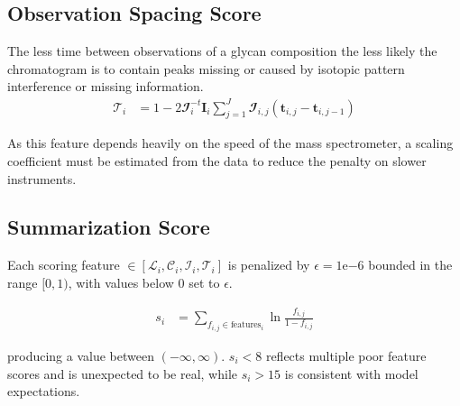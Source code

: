     \subsection{Observation Spacing Score}
        The less time between observations of a glycan composition the less likely the chromatogram
        is to contain peaks missing or caused by isotopic pattern interference or missing information.
        \begin{align}
            \mathscr{T}_i &= 1 - 2\mathbfcal{I}_i^{-t}\mathbf{I}_i\sum_{j=1}^J\mathbfcal{I}_{i, j}(
                \mathbf{t}_{i, j} - \mathbf{t}_{i, j - 1})
        \end{align}

        As this feature depends heavily on the speed of the mass spectrometer, a scaling coefficient
        must be estimated from the data to reduce the penalty on slower instruments.

    \subsection{Summarization Score}
        Each scoring feature $\in \left[\mathscr{L}_i, \mathscr{C}_i, \mathscr{I}_i,
        \mathscr{T}_i\right]$ is penalized by $\epsilon = 1\mathrm{e}{-6}$ bounded in
        the range $[0, 1)$, with values below 0 set to $\epsilon$.

        \begin{align}
            s_i &= \sum_{f_{i,j} \in \text{features}_i}{\ln{
                \frac{f_{i, j}}{1 - f_{i, j}}
                }
            }
        \end{align}

        \noindent producing a value between $(-\infty, \infty)$. $s_i < 8$ reflects multiple
        poor feature scores and is unexpected to be real, while $s_i > 15$ is
        consistent with model expectations.